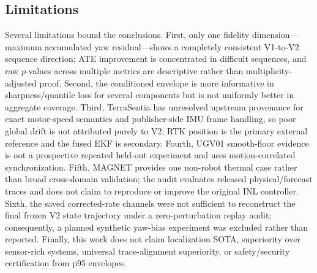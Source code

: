 \documentclass[journal]{IEEEtran}
\begin{document}
\subsection{Limitations}
Several limitations bound the conclusions. First, only one fidelity dimension---maximum accumulated yaw residual---shows a completely consistent V1-to-V2 sequence direction; ATE improvement is concentrated in difficult sequences, and raw $p$-values across multiple metrics are descriptive rather than multiplicity-adjusted proof. Second, the conditioned envelope is more informative in sharpness/quantile loss for several components but is not uniformly better in aggregate coverage. Third, TerraSentia has unresolved upstream provenance for exact motor-speed semantics and publisher-side IMU frame handling, so poor global drift is not attributed purely to V2; RTK position is the primary external reference and the fused EKF is secondary. Fourth, UGV01 smooth-floor evidence is not a prospective repeated held-out experiment and uses motion-correlated synchronization. Fifth, MAGNET provides one non-robot thermal case rather than broad cross-domain validation; the audit evaluates released physical/forecast traces and does not claim to reproduce or improve the original INL controller. Sixth, the saved corrected-rate channels were not sufficient to reconstruct the final frozen V2 state trajectory under a zero-perturbation replay audit; consequently, a planned synthetic yaw-bias experiment was excluded rather than reported. Finally, this work does not claim localization SOTA, superiority over sensor-rich systems, universal trace-alignment superiority, or safety/security certification from p95 envelopes.
\end{document}
